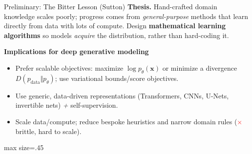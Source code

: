 \documentclass[aspectratio=169]{beamer}
\newcommand{\xmark}{\textcolor{red}{\ensuremath{\times}}}
\begin{document}
\begin{frame}{Preliminary: The Bitter Lesson (Sutton)}
\small
\textbf{Thesis.} Hand-crafted domain knowledge scales poorly; progress comes from \textit{general-purpose} methods that learn directly from data with lots of compute. Design \textbf{mathematical learning algorithms} so models \textit{acquire} the distribution, rather than hard-coding it.

\vspace{0.35em}
\textbf{Implications for deep generative modeling}
\begin{itemize}
  \item Prefer scalable objectives: maximize $\log p_\theta(\mathbf{x})$ or minimize a divergence $D( p_{\text{data}} \Vert p_\theta )$; use variational bounds/score objectives.
  \item Use generic, data-driven representations (Transformers, CNNs, U-Nets, invertible nets) \textit{+} self-supervision.
  \item Scale data/compute; reduce bespoke heuristics and narrow domain rules (\xmark \; brittle, hard to scale).
\end{itemize}

\vspace{0.35em}
\begin{center}
\begin{adjustbox}{max size={\linewidth}{.45\textheight}}
\end{adjustbox}
\end{center}

\end{frame}
\end{document}
